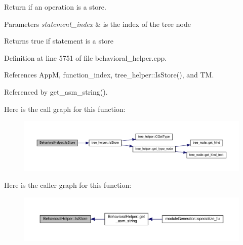 Return if an operation is a store. 


\begin{DoxyParams}{Parameters}
{\em statement\+\_\+index} & is the index of the tree node \\
\hline
\end{DoxyParams}
\begin{DoxyReturn}{Returns}
true if statement is a store 
\end{DoxyReturn}


Definition at line 5751 of file behavioral\+\_\+helper.\+cpp.



References AppM, function\+\_\+index, tree\+\_\+helper\+::\+Is\+Store(), and TM.



Referenced by get\+\_\+asm\+\_\+string().

Here is the call graph for this function\+:
\nopagebreak
\begin{figure}[H]
\begin{center}
\leavevmode
\includegraphics[width=350pt]{dd/db2/classBehavioralHelper_ad7192a9a6392ac06d5d2cc429267445a_cgraph}
\end{center}
\end{figure}
Here is the caller graph for this function\+:
\nopagebreak
\begin{figure}[H]
\begin{center}
\leavevmode
\includegraphics[width=350pt]{dd/db2/classBehavioralHelper_ad7192a9a6392ac06d5d2cc429267445a_icgraph}
\end{center}
\end{figure}
\mbox{\label{classBehavioralHelper_ad96b5f4d33d92f732ad3a30a70b42643}} 
